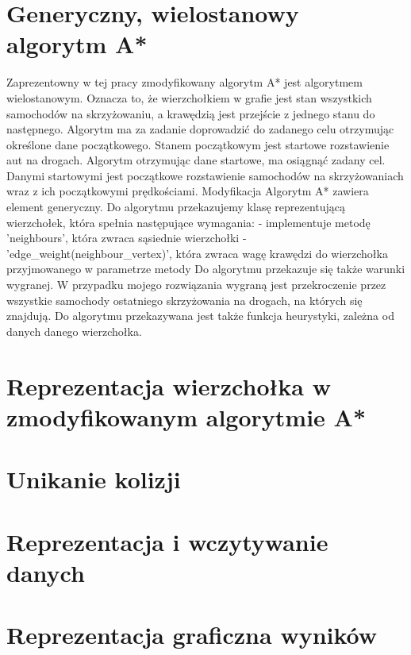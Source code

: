 \section{Generyczny, wielostanowy algorytm A*}

Zaprezentowny w tej pracy zmodyfikowany algorytm A* jest algorytmem wielostanowym. Oznacza to, że wierzchołkiem w grafie jest stan wszystkich samochodów na skrzyżowaniu, a krawędzią jest przejście z jednego stanu do następnego.
\newline
Algorytm ma za zadanie doprowadzić do zadanego celu otrzymując określone dane początkowego. Stanem początkowym jest startowe rozstawienie aut na drogach.
\newline
Algorytm otrzymując dane startowe, ma osiągnąć zadany cel. Danymi startowymi jest początkowe rozstawienie samochodów na skrzyżowaniach wraz z ich początkowymi prędkościami.
\newline
Modyfikacja Algorytm A* zawiera element generyczny. Do algorytmu przekazujemy klasę reprezentującą wierzchołek, która spełnia następujące wymagania:
\newline
- implementuje metodę 'neighbours', która zwraca sąsiednie wierzchołki 
\newline
- 'edge\_weight(neighbour\_vertex)', która zwraca wagę krawędzi do wierzchołka przyjmowanego w parametrze metody
\newline
\newline
Do algorytmu przekazuje się także warunki wygranej. W przypadku mojego rozwiązania wygraną jest przekroczenie przez wszystkie samochody ostatniego skrzyżowania na drogach, na których się znajdują.
\newline
Do algorytmu przekazywana jest także funkcja heurystyki, zależna od danych danego wierzchołka.

\section{Reprezentacja wierzchołka w zmodyfikowanym algorytmie A*}

\section{Unikanie kolizji}

\section{Reprezentacja i wczytywanie danych}

\section{Reprezentacja graficzna wyników}
